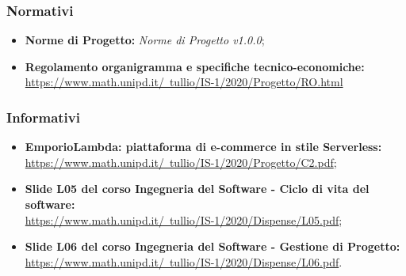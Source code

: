 \subsubsection{Normativi}
\begin{itemize}
    \item \textbf{Norme di Progetto: } \emph{Norme di Progetto v1.0.0};
    \item \textbf{Regolamento organigramma e specifiche tecnico-economiche: } \\ \href{https://www.math.unipd.it/~tullio/IS-1/2020/Progetto/RO.html}{https://www.math.unipd.it/~tullio/IS-1/2020/Progetto/RO.html}
\end{itemize}
\subsubsection{Informativi}
\begin{itemize}
    \item \textbf{EmporioLambda: piattaforma di e-commerce in stile Serverless: } \\ \href{https://www.math.unipd.it/~tullio/IS-1/2020/Progetto/C2.pdf}{https://www.math.unipd.it/~tullio/IS-1/2020/Progetto/C2.pdf};
    \item \textbf{Slide L05 del corso Ingegneria del Software - Ciclo di vita del software: } \\ \href{https://www.math.unipd.it/~tullio/IS-1/2020/Dispense/L05.pdf}{https://www.math.unipd.it/~tullio/IS-1/2020/Dispense/L05.pdf};
    \item \textbf{Slide L06 del corso Ingegneria del Software - Gestione di Progetto: } \\ \href{https://www.math.unipd.it/~tullio/IS-1/2020/Dispense/L06.pdf}{https://www.math.unipd.it/~tullio/IS-1/2020/Dispense/L06.pdf}.
\end{itemize}
